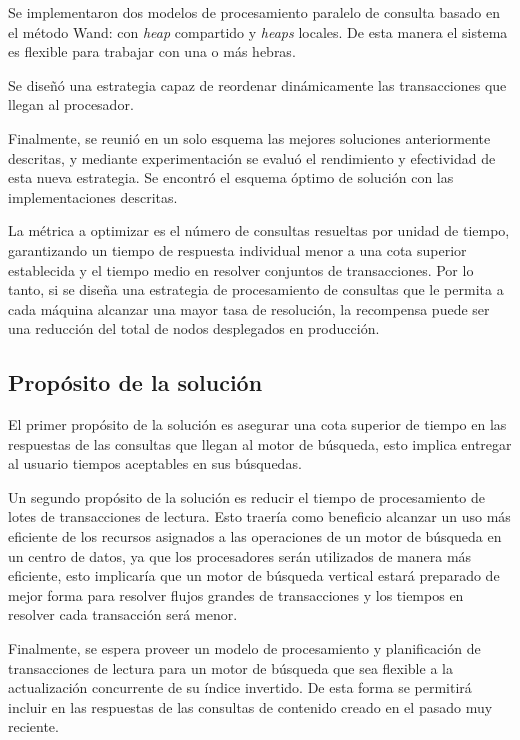 Se implementaron dos modelos de procesamiento paralelo de consulta basado en el método Wand: con \textit{heap} compartido y \textit{heaps} locales. De esta manera el sistema es flexible para trabajar con una o más hebras.

Se diseñó una estrategia capaz de reordenar dinámicamente las transacciones que llegan al procesador. 

Finalmente, se reunió en un solo esquema las mejores soluciones anteriormente descritas, y mediante experimentación se evaluó el rendimiento y efectividad de esta nueva estrategia. Se encontró el esquema óptimo de solución con las implementaciones descritas.

La métrica a optimizar es el número de consultas resueltas por unidad de tiempo, garantizando un tiempo de respuesta individual menor a una cota superior establecida y el tiempo medio en resolver conjuntos de transacciones. Por lo tanto, si se diseña una estrategia de procesamiento de consultas que le permita a cada máquina alcanzar una mayor tasa de resolución, la recompensa puede ser una reducción del total de nodos desplegados en producción.


\subsection{Prop\'osito de la solución}
\label{intro:propositosolucion}

El primer propósito de la solución es asegurar una cota superior de tiempo en las respuestas de las consultas que llegan al motor de búsqueda, esto implica entregar al usuario tiempos aceptables en sus búsquedas.

Un segundo propósito de la solución es reducir el tiempo de procesamiento de lotes de transacciones de lectura. Esto traería como beneficio alcanzar un uso más eficiente de los recursos asignados a las operaciones de un motor de búsqueda en un centro de datos, ya que los procesadores serán utilizados de manera más eficiente, esto implicaría que un motor de búsqueda vertical estará preparado de mejor forma para resolver flujos grandes de transacciones y los tiempos en resolver cada transacción será menor.

Finalmente, se espera proveer un modelo de procesamiento y planificación de transacciones de lectura para un motor de búsqueda que sea flexible a la actualización concurrente de su índice invertido. De esta forma se permitirá incluir en las respuestas de las consultas de contenido creado en el pasado muy reciente.

